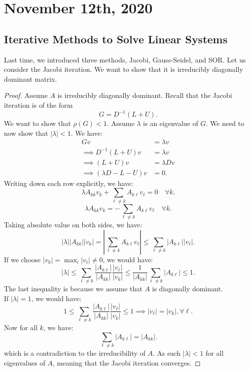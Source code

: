 \documentclass[../main/main.tex]{subfiles}
\begin{document}
\section{November 12th, 2020}
\subsection{Iterative Methods to Solve Linear Systems}
Last time, we introduced three methods, Jacobi, Gauss-Seidel, and SOR. Let us consider the Jacobi iteration. We want to show that it is irreducibly diagonally dominant matrix.

\begin{proof} Assume $A$ is irreducibly diagonally dominant.
    Recall that the Jacobi iteration is of the form \[
        G = D^{-1}(L+U)
    .\] We want to show that $\rho(G) < 1$. Assume  $\lambda$ is an eigenvalue of  $G$. We need to now show that $|\lambda| < 1$. We have:
    \begin{align*} 
        Gv &= \lambda v \\
        \implies D^{-1}(L+U) v &=  \lambda v \\
        \implies(L+U)v &=  \lambda Dv \\
        \implies (\lambda D - L - U) v &= 0
    .\end{align*}
    Writing down each row explicitly, we have: \[
    \lambda A_{k k} v_k + \sum_{\ell \neq k} A_{k \ell} v_{\ell} = 0 \quad \forall  k
    .\] \[
    \lambda A_{k k} v_k  = - \sum_{\ell \neq k} A_{k \ell} v_{\ell} \quad \forall  k 
    .\] Taking absolute value on both sides, we have: \[
    |\lambda | |A_{k k} | |v_k | = | \sum_{\ell \neq k } A_{k \ell} v_\ell | \le  \sum_{\ell \neq k} | A_{k\ell}| |v_{\ell}|
    .\] If we choose $|v_k| = \max_i |v_i|\neq 0$, we would have:  \[
    |\lambda| \le  \sum_{\ell \neq k} \frac{|A_{k \ell}|}{|A_{k k}|} \frac{|v_{\ell}|}{|v_k|} \le \frac{1}{|A_{k k}|} \sum_{\ell \neq k} |A_{k \ell}| \le  1
    .\] The last inequality is because we assume that $A$ is diagonally dominant. \\

If $|\lambda|= 1$, we would have: \[
1 \le  \sum_{\ell \neq k} \frac{|A_{k \ell}|}{|A_{k k}|} \frac{|v_{\ell}|}{|v_k|}  \le  1 \implies |v_{\ell}| = |v_{k}| , \forall  \ell
.\] Now for all $k$, we have: \[
\sum_{\ell \neq k} |A_{k \ell}| = |A_{kk}| 
.\] which is a contradiction to the irreducibility of $A$. As such $|\lambda| < 1$ for all eigenvalues of  $A$, meaning that the Jacobi iteration converges.
\end{proof}
\end{document}
